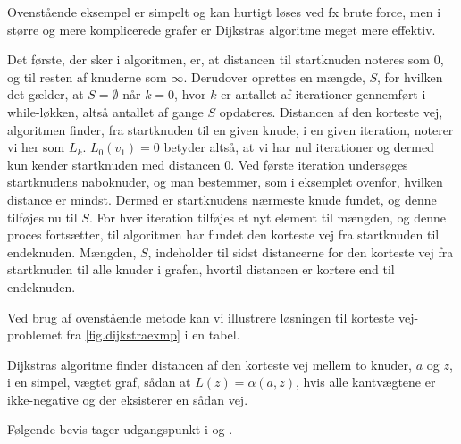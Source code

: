 Ovenstående eksempel er simpelt og kan hurtigt løses ved fx brute force, men i større og mere komplicerede grafer er Dijkstras algoritme meget mere effektiv.

Det første, der sker i algoritmen, er, at distancen til startknuden noteres som $0$, og til resten af knuderne som $\infty$. Derudover oprettes en mængde, $S$, for hvilken det gælder, at $S = \emptyset$ når $k = 0$, hvor $k$ er antallet af iterationer gennemført i while-løkken, altså antallet af gange $S$ opdateres. Distancen af den korteste vej, algoritmen finder, fra startknuden til en given knude, i en given iteration, noterer vi her som $L_k$. $L_{0}(v_1)=0$ betyder altså, at vi har nul iterationer og dermed kun kender startknuden med distancen $0$. Ved første iteration undersøges startknudens naboknuder, og man bestemmer, som i eksemplet ovenfor, hvilken distance er mindst. Dermed er startknudens nærmeste knude fundet, og denne tilføjes nu til $S$. For hver iteration tilføjes et nyt element til mængden, og denne proces fortsætter, til algoritmen har fundet den korteste vej fra startknuden til endeknuden. Mængden, $S$, indeholder til sidst distancerne for den korteste vej fra startknuden til alle knuder i grafen, hvortil distancen er kortere end til endeknuden. 

Ved brug af ovenstående metode kan vi illustrere løsningen til korteste vej-problemet fra \autoref{fig.dijkstraexmp} i en tabel.



\begin{thm} \label{thm:dijkstra}
Dijkstras algoritme finder distancen af den korteste vej mellem to knuder, $a$ og $z$, i en simpel, vægtet graf, sådan at $L(z)=\alpha(a,z)$, hvis alle kantvægtene er ikke-negative og der eksisterer en sådan vej. 
\end{thm}

Følgende bevis tager udgangspunkt i \citep{dmat} og \citep{pdf:dijkProof}.

